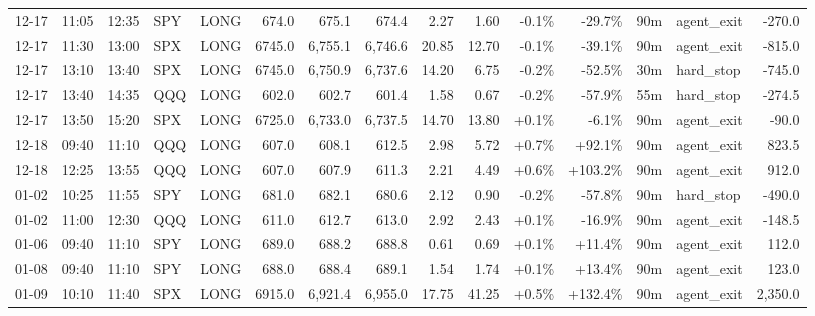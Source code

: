 \documentclass[11pt,a4paper,twoside]{article}
\begin{document}
\begin{landscape}
\begin{center}
\begin{longtable}{>{\color{txtmain}}l l l l l r r r r r r r r >{\color{txtmain}}l r}
12-17 & 11:05 & 12:35 & SPY & LONG & 674.0 & 675.1 & 674.4 & 2.27 & 1.60 & \textcolor{lossred}{-0.1\%} & \textcolor{lossred}{-29.7\%} & 90m & agent\_exit & \textcolor{lossred}{-270.0} \\
12-17 & 11:30 & 13:00 & SPX & LONG & 6745.0 & 6,755.1 & 6,746.6 & 20.85 & 12.70 & \textcolor{lossred}{-0.1\%} & \textcolor{lossred}{-39.1\%} & 90m & agent\_exit & \textcolor{lossred}{-815.0} \\
12-17 & 13:10 & 13:40 & SPX & LONG & 6745.0 & 6,750.9 & 6,737.6 & 14.20 & 6.75 & \textcolor{lossred}{-0.2\%} & \textcolor{lossred}{-52.5\%} & 30m & hard\_stop & \textcolor{lossred}{-745.0} \\
12-17 & 13:40 & 14:35 & QQQ & LONG & 602.0 & 602.7 & 601.4 & 1.58 & 0.67 & \textcolor{lossred}{-0.2\%} & \textcolor{lossred}{-57.9\%} & 55m & hard\_stop & \textcolor{lossred}{-274.5} \\
12-17 & 13:50 & 15:20 & SPX & LONG & 6725.0 & 6,733.0 & 6,737.5 & 14.70 & 13.80 & \textcolor{wingreen}{+0.1\%} & \textcolor{lossred}{-6.1\%} & 90m & agent\_exit & \textcolor{lossred}{-90.0} \\
12-18 & 09:40 & 11:10 & QQQ & LONG & 607.0 & 608.1 & 612.5 & 2.98 & 5.72 & \textcolor{wingreen}{+0.7\%} & \textcolor{wingreen}{+92.1\%} & 90m & agent\_exit & \textcolor{wingreen}{823.5} \\
12-18 & 12:25 & 13:55 & QQQ & LONG & 607.0 & 607.9 & 611.3 & 2.21 & 4.49 & \textcolor{wingreen}{+0.6\%} & \textcolor{wingreen}{+103.2\%} & 90m & agent\_exit & \textcolor{wingreen}{912.0} \\
01-02 & 10:25 & 11:55 & SPY & LONG & 681.0 & 682.1 & 680.6 & 2.12 & 0.90 & \textcolor{lossred}{-0.2\%} & \textcolor{lossred}{-57.8\%} & 90m & hard\_stop & \textcolor{lossred}{-490.0} \\
01-02 & 11:00 & 12:30 & QQQ & LONG & 611.0 & 612.7 & 613.0 & 2.92 & 2.43 & \textcolor{wingreen}{+0.1\%} & \textcolor{lossred}{-16.9\%} & 90m & agent\_exit & \textcolor{lossred}{-148.5} \\
01-06 & 09:40 & 11:10 & SPY & LONG & 689.0 & 688.2 & 688.8 & 0.61 & 0.69 & \textcolor{wingreen}{+0.1\%} & \textcolor{wingreen}{+11.4\%} & 90m & agent\_exit & \textcolor{wingreen}{112.0} \\
01-08 & 09:40 & 11:10 & SPY & LONG & 688.0 & 688.4 & 689.1 & 1.54 & 1.74 & \textcolor{wingreen}{+0.1\%} & \textcolor{wingreen}{+13.4\%} & 90m & agent\_exit & \textcolor{wingreen}{123.0} \\
01-09 & 10:10 & 11:40 & SPX & LONG & 6915.0 & 6,921.4 & 6,955.0 & 17.75 & 41.25 & \textcolor{wingreen}{+0.5\%} & \textcolor{wingreen}{+132.4\%} & 90m & agent\_exit & \textcolor{wingreen}{2,350.0} \\

\end{longtable}
\end{center}
\end{landscape}
\end{document}
